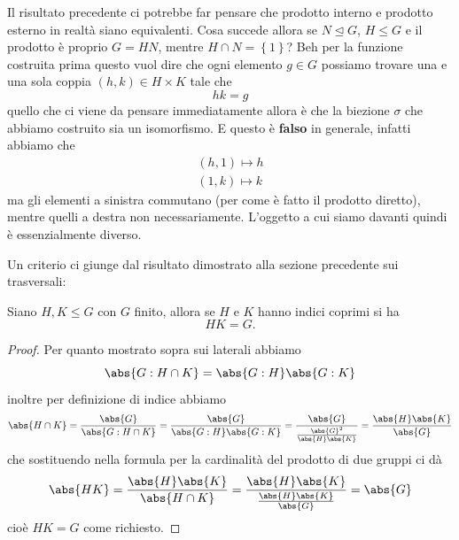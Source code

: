 \documentclass[11pt]{scrartcl}
\newcommand{\normal}{\mathrel{\unlhd}}
\begin{document}
	Il risultato precedente ci potrebbe far pensare che prodotto interno e prodotto esterno in realtà siano equivalenti. Cosa succede allora se $N\normal G$, $H\le G$ e il prodotto è proprio $G=HN$, mentre $H\cap N=\left\{1\right\}$? Beh per la funzione costruita prima questo vuol dire che ogni elemento $g\in G$ possiamo trovare una e una sola coppia $(h,k)\in H\times K$ tale che
	$$hk=g$$
	quello che ci viene da pensare immediatamente allora è che la biezione $\sigma$ che abbiamo costruito sia un isomorfismo. E questo è \textbf{falso} in generale, infatti abbiamo che
	\begin{gather*}
		(h,1)\mapsto h \\
		(1,k)\mapsto k
	\end{gather*}
	ma gli elementi a sinistra commutano (per come è fatto il prodotto diretto), mentre quelli a destra non necessariamente. L'oggetto a cui siamo davanti quindi è essenzialmente diverso.
	
	Un criterio ci giunge dal risultato dimostrato alla sezione precedente sui trasversali:
	\begin{proposition}
		Siano $H,K\le G$ con $G$ finito, allora se $H$ e $K$ hanno indici coprimi si ha
		$$HK=G.$$
	\end{proposition}
	\begin{proof}
		Per quanto mostrato sopra sui laterali abbiamo
		$$\abs{G:H\cap K}=\abs{G:H}\abs{G:K}$$
		inoltre per definizione di indice abbiamo
		$$\abs{H\cap K}=\frac{\abs{G}}{\abs{G:H\cap K}}=\frac{\abs{G}}{\abs{G:H}\abs{G:K}}=\frac{\abs{G}}{\frac{\abs{G}^2}{\abs{H}\abs{K}}}=\frac{\abs{H}\abs{K}}{\abs{G}}$$
		che sostituendo nella formula per la cardinalità del prodotto di due gruppi ci dà
		$$\abs{HK}=\frac{\abs{H}\abs{K}}{\abs{H\cap K}}=\frac{\abs{H}\abs{K}}{\frac{\abs{H}\abs{K}}{\abs{G}}}=\abs{G}$$
		cioè $HK=G$ come richiesto.
	\end{proof}
\end{document}
